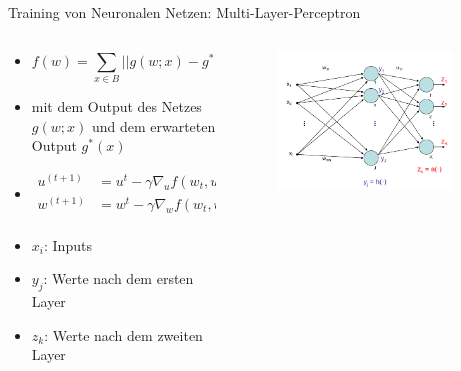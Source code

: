 \documentclass[aspectratio=1610, xcolor=dvipsnames, 9pt]{beamer}
\begin{document}
      \begin{frame}{Training von Neuronalen Netzen: Multi-Layer-Perceptron}
        \begin{columns}
          \begin{column}{0.7\textwidth}
            \begin{itemize}
              \item
              \begin{equation}
                f(w) = \sum_{x\in B} || g(w; x) - g^*(x) ||^2 \quad \rightarrow \text{  min  }
              \end{equation} 
              \item mit dem Output des Netzes $ g(w;x) $ und dem erwarteten Output $ g^*(x) $ 
              \item 
              \begin{align}
                 u^{(t+1)} &= u^t - \gamma \nabla_u f(w_t , u_t) \\
                 w^{(t+1)} &= w^t - \gamma \nabla_w f(w_t , u_t) \\
              \end{align}
              \item $x_i$: Inputs 
              \item $y_j$: Werte nach dem ersten Layer
              \item $z_k$: Werte nach dem zweiten Layer
            \end{itemize}
          \end{column}
          \begin{column}{0.3\textwidth}
            \begin{figure}
              \centering
                          \includegraphics[width=0.9\textwidth]{images/MLP2.png}
              \end{figure}
          \end{column}
        \end{columns}
      \end{frame}
\end{document}

